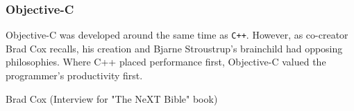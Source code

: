 \par
\vspace{-10pt}
\subsubsection{Objective-C}
Objective-C was developed around the same time as \verb!C++!. However, as co-creator Brad Cox recalls, his creation and Bjarne Stroustrup's brainchild had opposing philosophies. Where C++ placed performance first, Objective-C valued the programmer's productivity first.\\
\par
{} {Brad Cox (Interview for "The NeXT Bible" book)}\\
\par


